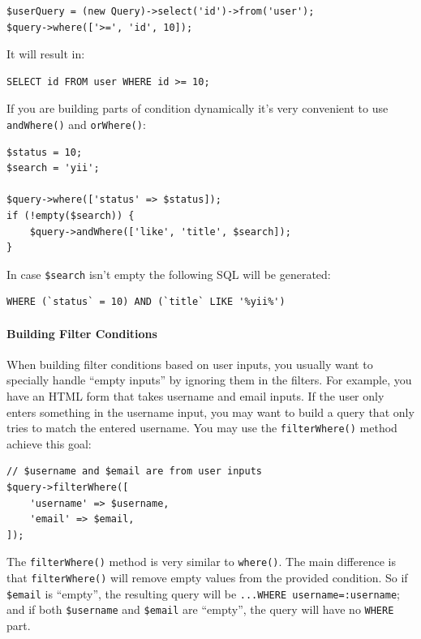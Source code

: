 \lstset{language=php}\begin{lstlisting}
$userQuery = (new Query)->select('id')->from('user');
$query->where(['>=', 'id', 10]);
\end{lstlisting}
It will result in:

\lstset{language=sql}\begin{lstlisting}
SELECT id FROM user WHERE id >= 10;
\end{lstlisting}
If you are building parts of condition dynamically it's very convenient to use \lstinline|andWhere()| and \lstinline|orWhere()|:

\lstset{language=php}\begin{lstlisting}
$status = 10;
$search = 'yii';

$query->where(['status' => $status]);
if (!empty($search)) {
    $query->andWhere(['like', 'title', $search]);
}
\end{lstlisting}
In case \lstinline|$search| isn't empty the following SQL will be generated:

\lstset{language=sql}\begin{lstlisting}
WHERE (`status` = 10) AND (`title` LIKE '%yii%')
\end{lstlisting}
\paragraph{Building Filter Conditions}
When building filter conditions based on user inputs, you usually want to specially handle ``empty inputs''
by ignoring them in the filters. For example, you have an HTML form that takes username and email inputs.
If the user only enters something in the username input, you may want to build a query that only tries to
match the entered username. You may use the \lstinline|filterWhere()| method achieve this goal:

\lstset{language=php}\begin{lstlisting}
// $username and $email are from user inputs
$query->filterWhere([
    'username' => $username,
    'email' => $email,
]);
\end{lstlisting}
The \lstinline|filterWhere()| method is very similar to \lstinline|where()|. The main difference is that \lstinline|filterWhere()|
will remove empty values from the provided condition. So if \lstinline|$email| is ``empty'', the resulting query
will be \lstinline|...WHERE username=:username|; and if both \lstinline|$username| and \lstinline|$email| are ``empty'', the query
will have no \lstinline|WHERE| part.

